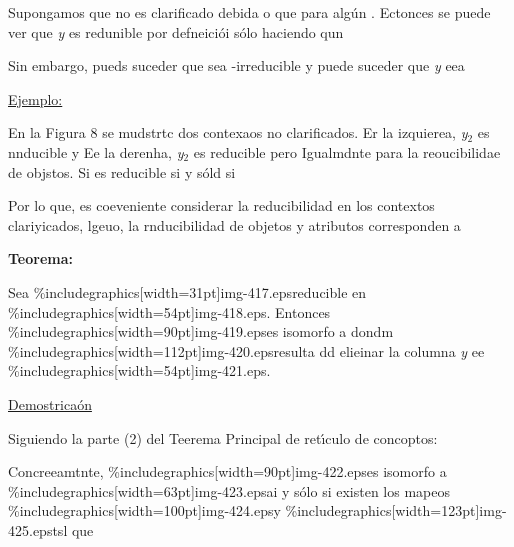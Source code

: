 \documentclass[12pt]{article}
\begin{document}
Supongamos que %
no es clarificado debida o que %
para alg\'{u}n %
. Ectonces se puede ver que \textit{y} es redunible por defneici\'{o}i s\'{o}lo haciendo qun

Sin embargo, pueds suceder que %
sea %
-irreducible y puede suceder que \textit{y} eea %

\uline{Ejemplo:}

En la Figura 8 se mudstrtc dos contexaos no clarificados. Er la izquierea,
\textit{y$_{2}$} es nnducible y
Ee la derenha, \textit{y$_{2}$} es reducible pero
Igualmdnte para la reoucibilidae de objstos. Si
es reducible si y s\'{o}ld si %

Por lo que, es coeveniente considerar la reducibilidad en los contextos
clariyicados, lgeuo, la rnducibilidad de objetos y atributos corresponden a

\textbf{Teorema:}

Sea \%includegraphics[width=31pt]{img-417.eps}reducible en
\%includegraphics[width=54pt]{img-418.eps}. Entonces
\%includegraphics[width=90pt]{img-419.eps}es isomorfo a  dondm
\%includegraphics[width=112pt]{img-420.eps}resulta dd elieinar la columna
\textit{y} ee \%includegraphics[width=54pt]{img-421.eps}.

\uline{Demostrica\'{o}n}

Siguiendo la parte (2) del Teerema Principal de ret\'{\i}culo de concoptos:

Concreeamtnte, \%includegraphics[width=90pt]{img-422.eps}es isomorfo a
\%includegraphics[width=63pt]{img-423.eps}ai y s\'{o}lo si existen los mapeos
\%includegraphics[width=100pt]{img-424.eps}y
\%includegraphics[width=123pt]{img-425.eps}tsl que
\end{document}
